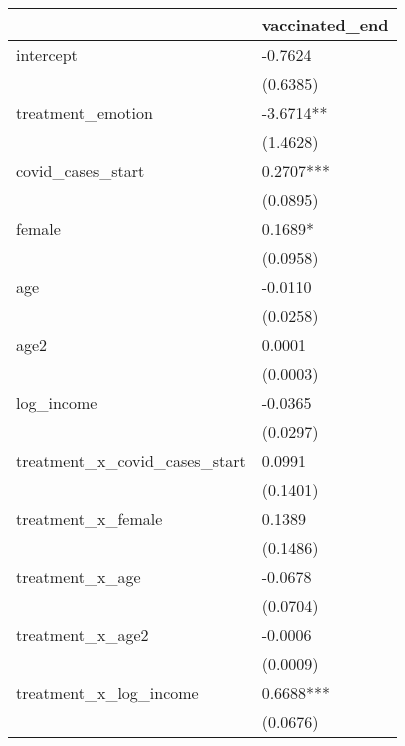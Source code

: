 \begin{table}
\caption{}
\label{}
\begin{center}
\begin{tabular}{ll}
\hline
                                  & vaccinated\_end  \\
\hline
intercept                         & -0.7624          \\
                                  & (0.6385)         \\
treatment\_emotion                & -3.6714**        \\
                                  & (1.4628)         \\
covid\_cases\_start               & 0.2707***        \\
                                  & (0.0895)         \\
female                            & 0.1689*          \\
                                  & (0.0958)         \\
age                               & -0.0110          \\
                                  & (0.0258)         \\
age2                              & 0.0001           \\
                                  & (0.0003)         \\
log\_income                       & -0.0365          \\
                                  & (0.0297)         \\
treatment\_x\_covid\_cases\_start & 0.0991           \\
                                  & (0.1401)         \\
treatment\_x\_female              & 0.1389           \\
                                  & (0.1486)         \\
treatment\_x\_age                 & -0.0678          \\
                                  & (0.0704)         \\
treatment\_x\_age2                & -0.0006          \\
                                  & (0.0009)         \\
treatment\_x\_log\_income         & 0.6688***        \\
                                  & (0.0676)         \\
\hline
\end{tabular}
\end{center}
\end{table}